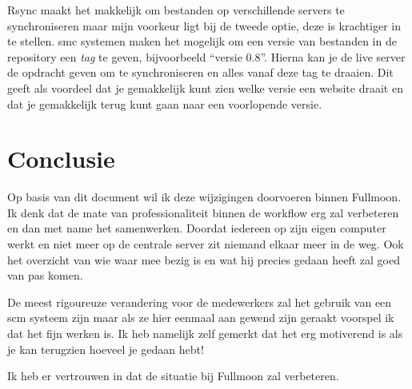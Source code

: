 \documentclass[12pt,a4paper]{article}
\begin{document}
    Rsync maakt het makkelijk om bestanden op verschillende servers te synchroniseren maar mijn voorkeur ligt bij de tweede optie, deze is krachtiger in te stellen.
    {\sc smc} systemen maken het mogelijk om een versie van bestanden in de repository een \emph{tag} te geven, bijvoorbeeld ``versie 0.8''. Hierna kan je de live server de opdracht geven om te synchroniseren en alles vanaf deze tag te draaien. Dit geeft als voordeel dat je gemakkelijk kunt zien welke versie een website draait en dat je gemakkelijk terug kunt gaan naar een voorlopende versie.
    
  \section{Conclusie}
  
  Op basis van dit document wil ik deze wijzigingen doorvoeren binnen Fullmoon. Ik denk dat de mate van professionaliteit binnen de workflow erg zal verbeteren en dan met name het samenwerken. Doordat iedereen op zijn eigen computer werkt en niet meer op de centrale server zit niemand elkaar meer in de weg. Ook het overzicht van wie waar mee bezig is en wat hij precies gedaan heeft zal goed van pas komen.

  De meest rigoureuze verandering voor de medewerkers zal het gebruik van een {\sc scm} systeem zijn maar als ze hier eenmaal aan gewend zijn geraakt voorspel ik dat het fijn werken is. Ik heb namelijk zelf gemerkt dat het erg motiverend is als je kan terugzien hoeveel je gedaan hebt!
  
  Ik heb er vertrouwen in dat de situatie bij Fullmoon zal verbeteren.
\end{document}
